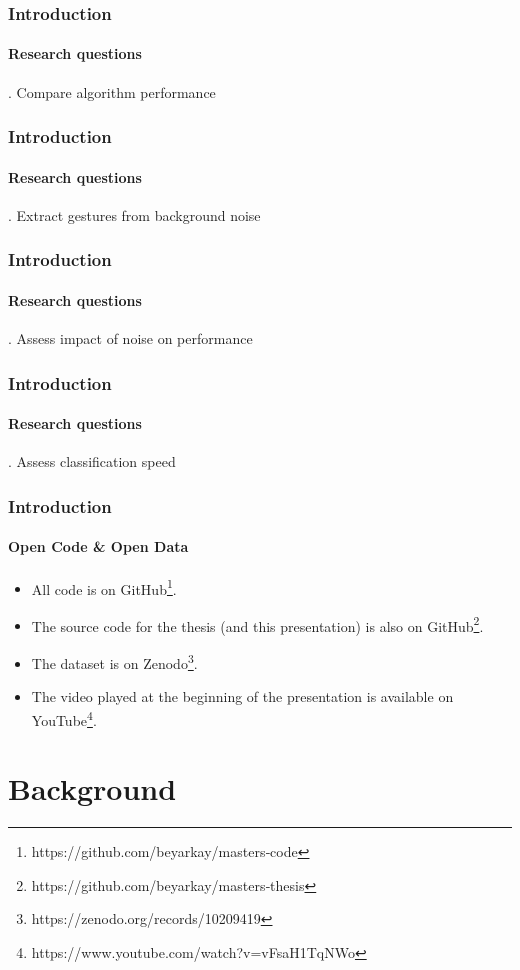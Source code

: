\documentclass[xcolor={svgnames,table},10pt,fleqn]{beamer}
\begin{document}
\begin{frame}
    \frametitle{Introduction}
    \framesubtitle{Research questions}
    . Compare algorithm performance
\end{frame}

\begin{frame}
    \frametitle{Introduction}
    \framesubtitle{Research questions}
    . Extract gestures from background noise
\end{frame}

\begin{frame}
    \frametitle{Introduction}
    \framesubtitle{Research questions}
    . Assess impact of noise on performance
\end{frame}

\begin{frame}
    \frametitle{Introduction}
    \framesubtitle{Research questions}
    . Assess classification speed
\end{frame}

\begin{frame}
    \frametitle{Introduction}
    \framesubtitle{Open Code \& Open Data}
    \begin{itemize}
        \item All code is on
            GitHub\footnote{https://github.com/beyarkay/masters‐code}.
        \item The source code for the thesis (and this presentation) is also on
            GitHub\footnote{https://github.com/beyarkay/masters‐thesis}.
        \item The dataset is on
            Zenodo\footnote{https://zenodo.org/records/10209419}.
        \item The video played at the beginning of the presentation is
            available on
            YouTube\footnote{https://www.youtube.com/watch?v=vFsaH1TqNWo}.
    \end{itemize}
\end{frame}

\section{Background}
\end{document}
